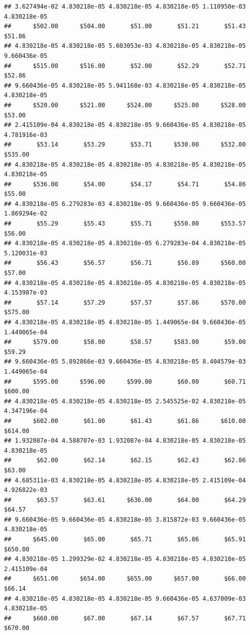 \begin{verbatim}
## 3.627494e-02 4.830218e-05 4.830218e-05 4.830218e-05 1.110950e-03 4.830218e-05 
##      $502.00      $504.00       $51.00       $51.21       $51.43       $51.86 
## 4.830218e-05 4.830218e-05 5.603053e-03 4.830218e-05 4.830218e-05 9.660436e-05 
##      $515.00      $516.00       $52.00       $52.29       $52.71       $52.86 
## 9.660436e-05 4.830218e-05 5.941168e-03 4.830218e-05 4.830218e-05 4.830218e-05 
##      $520.00      $521.00      $524.00      $525.00      $528.00       $53.00 
## 2.415109e-04 4.830218e-05 4.830218e-05 9.660436e-05 4.830218e-05 4.781916e-03 
##       $53.14       $53.29       $53.71      $530.00      $532.00      $535.00 
## 4.830218e-05 4.830218e-05 4.830218e-05 4.830218e-05 4.830218e-05 4.830218e-05 
##      $536.00       $54.00       $54.17       $54.71       $54.86       $55.00 
## 4.830218e-05 6.279283e-03 4.830218e-05 9.660436e-05 9.660436e-05 1.869294e-02 
##       $55.29       $55.43       $55.71      $550.00      $553.57       $56.00 
## 4.830218e-05 4.830218e-05 4.830218e-05 6.279283e-04 4.830218e-05 5.120031e-03 
##       $56.43       $56.57       $56.71       $56.89      $560.00       $57.00 
## 4.830218e-05 4.830218e-05 4.830218e-05 4.830218e-05 4.830218e-05 4.153987e-03 
##       $57.14       $57.29       $57.57       $57.86      $570.00      $575.00 
## 4.830218e-05 4.830218e-05 4.830218e-05 1.449065e-04 9.660436e-05 1.449065e-04 
##      $579.00       $58.00       $58.57      $583.00       $59.00       $59.29 
## 9.660436e-05 5.892866e-03 9.660436e-05 4.830218e-05 8.404579e-03 1.449065e-04 
##      $595.00      $596.00      $599.00       $60.00       $60.71      $600.00 
## 4.830218e-05 4.830218e-05 4.830218e-05 2.545525e-02 4.830218e-05 4.347196e-04 
##      $602.00       $61.00       $61.43       $61.86      $610.00      $614.00 
## 1.932087e-04 4.588707e-03 1.932087e-04 4.830218e-05 4.830218e-05 4.830218e-05 
##       $62.00       $62.14       $62.15       $62.43       $62.86       $63.00 
## 4.685311e-03 4.830218e-05 4.830218e-05 4.830218e-05 2.415109e-04 4.926822e-03 
##       $63.57       $63.61      $636.00       $64.00       $64.29       $64.57 
## 9.660436e-05 9.660436e-05 4.830218e-05 3.815872e-03 9.660436e-05 4.830218e-05 
##      $645.00       $65.00       $65.71       $65.86       $65.91      $650.00 
## 4.830218e-05 1.299329e-02 4.830218e-05 4.830218e-05 4.830218e-05 2.415109e-04 
##      $651.00      $654.00      $655.00      $657.00       $66.00       $66.14 
## 4.830218e-05 4.830218e-05 4.830218e-05 9.660436e-05 4.637009e-03 4.830218e-05 
##      $660.00       $67.00       $67.14       $67.57       $67.71      $670.00 

\end{verbatim}
